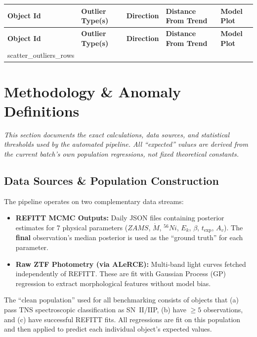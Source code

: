 \documentclass[11pt,a4paper]{article}
\begin{document}
\begin{longtable}{@{}l p{5.5cm} l l l@{}}
\toprule
\textbf{Object Id} & \textbf{Outlier Type(s)} & \textbf{Direction} & \textbf{Distance From Trend} & \textbf{Model Plot} \\ \midrule
\endfirsthead
\toprule
\textbf{Object Id} & \textbf{Outlier Type(s)} & \textbf{Direction} & \textbf{Distance From Trend} & \textbf{Model Plot} \\ \midrule
\endhead
\bottomrule
\endfoot
{scatter_outliers_rows}\end{longtable}
\clearpage

\section{Methodology \& Anomaly Definitions}
\textit{This section documents the exact calculations, data sources, and statistical thresholds used by the automated pipeline. All ``expected'' values are derived from the current batch's own population regressions, not fixed theoretical constants.}

\subsection*{Data Sources \& Population Construction}
The pipeline operates on two complementary data streams:
\begin{itemize}
    \item \textbf{REFITT MCMC Outputs:} Daily JSON files containing posterior estimates for 7 physical parameters ($ZAMS$, $\dot{M}$, $^{56}Ni$, $E_k$, $\beta$, $t_{\exp}$, $A_v$). The \textbf{final} observation's median posterior is used as the ``ground truth'' for each parameter.
    \item \textbf{Raw ZTF Photometry (via ALeRCE):} Multi-band light curves fetched independently of REFITT. These are fit with Gaussian Process (GP) regression to extract morphological features without model bias.
\end{itemize}
The ``clean population'' used for all benchmarking consists of objects that (a) pass TNS spectroscopic classification as SN~II/IIP, (b) have $\ge 5$ observations, and (c) have successful REFITT fits. All regressions are fit on this population and then applied to predict each individual object's expected values.
\end{document}
